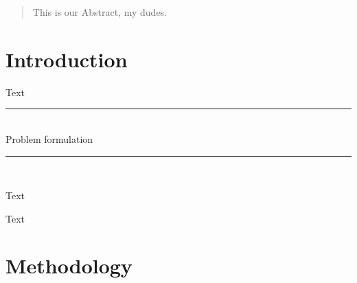 \documentclass[12p]{article}
\newcommand{\SlimHRule}{\rule{\linewidth}{0.25mm}} %
\begin{document}

\begin{abstract}
\thispagestyle{plain} %
    This is our Abstract, my dudes.

\end{abstract}

\newpage


\tableofcontents %
\thispagestyle{plain} %

\newpage %


\section{Introduction}

Text

\begin{center}
    \vspace{1em}
    \SlimHRule\\[0.1cm]
    \Large{Problem formulation}
    \SlimHRule\\[0.1cm]
    \vspace{1em}
\end{center}

Text \medskip

Text


\newpage
\section{Methodology} \label{Methodology}
\end{document}
